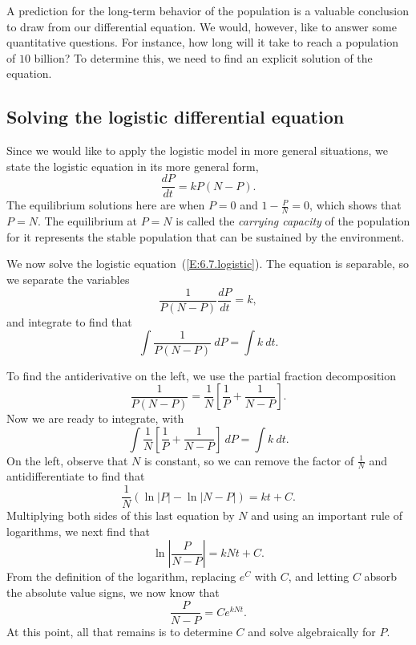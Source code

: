 A prediction for the long-term behavior of the population is a
valuable conclusion to draw from our differential equation.  We would,
however, like to answer some quantitative questions.  For instance,
how long will it take to reach a population of $10$ billion?  To determine this,
we need to find an explicit solution of the equation.  

\subsection*{Solving the logistic differential equation} 

Since we would like to apply the logistic model in more general situations, we state the logistic equation in its more general form,
\begin{equation} \label{E:6.7.logistic}
\frac{dP}{dt} = kP(N-P).
\end{equation}
The equilibrium solutions here are when $P=0$ and $1-\frac PN = 0$,
which shows that $P=N$.  The equilibrium at $P=N$ is called the {\em
  carrying capacity} of the population for it represents the stable
population that can be sustained by the environment.

We now solve the logistic equation~(\ref{E:6.7.logistic}).  The equation is separable, so we separate the variables
$$
\frac{1}{P(N-P)}\frac{dP}{dt} = k,
$$
and integrate to find that
$$
\int \frac{1}{P(N-P)}~dP = \int k~dt.
$$

To find the antiderivative on the left, we use the partial fraction decomposition
$$
\frac{1}{P(N-P)} = \frac 1N\left[\frac 1P + \frac 1{N-P}\right].
$$
Now we are ready to integrate, with 
$$
\int \frac 1N\left[\frac 1P + \frac 1{N-P}\right] ~dP  =  \int k~dt. 
$$
On the left, observe that $N$ is constant, so we can remove the factor of $\frac{1}{N}$ and antidifferentiate to find that
$$
\frac 1N (\ln|P| - \ln|N-P|)  =  kt + C.
$$
Multiplying both sides of this last equation by $N$ and using an important rule of logarithms, we next find that
$$\ln\left|\frac{P}{N-P}\right| = kNt + C.$$
From the definition of the logarithm, replacing $e^C$ with $C$, and letting $C$ absorb the absolute value signs, we now know that 
$$\frac{P}{N-P} =  Ce^{kNt}.$$
At this point, all that remains is to determine $C$ and solve algebraically for $P$.

